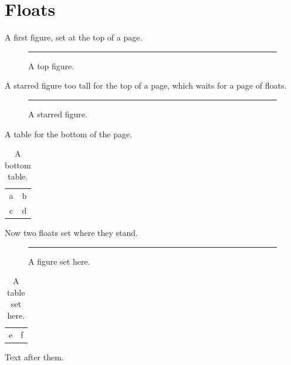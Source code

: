 \documentclass{article}
\begin{document}
\listoffigures
\listoftables
\section{Floats}
A first figure, set at the top of a page.
\begin{figure}[t]\centering\rule{4cm}{2cm}\caption{A top figure.}\end{figure}
A starred figure too tall for the top of a page, which waits for a page of floats.
\begin{figure}\centering\rule{4cm}{.75\textheight}\caption{A starred figure.}\end{figure}
A table for the bottom of the page.
\begin{table}[b]\centering\begin{tabular}{cc}a & b\\ c & d\end{tabular}\caption{A bottom table.}\end{table}
\clearpage
Now two floats set where they stand.
\begin{figure}[H]\centering\rule{4cm}{1cm}\caption{A figure set here.}\end{figure}
\begin{table}[H]\centering\begin{tabular}{cc}e & f\end{tabular}\caption{A table set here.}\end{table}
Text after them.
\end{document}
